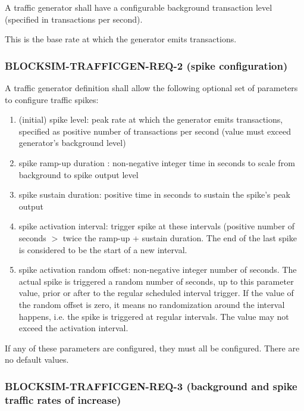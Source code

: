 \documentclass{scrreprt}
\begin{document}
        A traffic generator shall have a configurable background transaction
        level (specified in transactions per second).

        This is the base rate at which the generator emits transactions.

      \subsubsection{BLOCKSIM-TRAFFICGEN-REQ-2 (spike configuration)}

        A traffic generator definition shall allow the following optional set
        of parameters to configure traffic spikes:

        \begin{enumerate}
          \item (initial) spike level:
            peak rate at which the generator emits transactions,
            specified as positive number of transactions per
            second (value must exceed generator's background level)
          \item spike ramp-up duration :
            non-negative integer time in seconds to scale from background
            to spike output level
          \item spike sustain duration:
            positive time in seconds to sustain the spike's peak output
          \item spike activation interval:
            trigger spike at these intervals (positive number of
            seconds $>$ twice the ramp-up + sustain duration.
            The end of the last spike is considered to be the start of a new
            interval.
          \item spike activation random offset:
            non-negative integer number of seconds.
            The actual spike is triggered a random number of seconds, up to
            this parameter value, prior or after to the regular scheduled
            interval trigger.
            If the value of the random offset is zero, it means no
            randomization around the interval happens, i.e. the spike is
            triggered at regular intervals.
            The value may not exceed the activation interval.
        \end{enumerate}

        If any of these parameters are configured, they must all be configured.
        There are no default values.

      \subsubsection{BLOCKSIM-TRAFFICGEN-REQ-3 (background and spike traffic rates of increase)}
\end{document}

